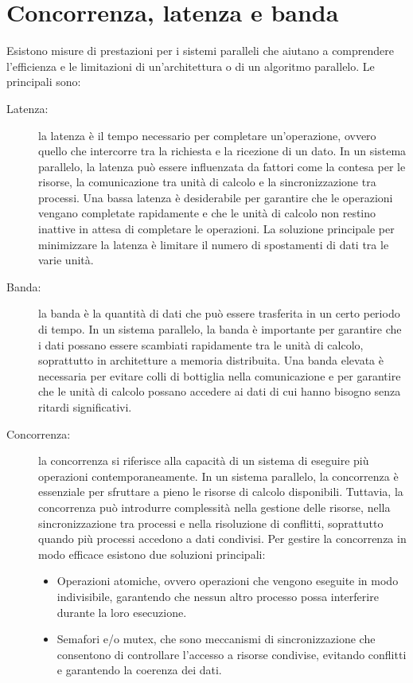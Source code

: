 \section{Concorrenza, latenza e banda}
Esistono misure di prestazioni per i sistemi paralleli che aiutano a comprendere l'efficienza e le limitazioni di un'architettura o di un algoritmo parallelo. Le principali sono:
\begin{description}
    \item[Latenza: ] la latenza è il tempo necessario per completare un'operazione, ovvero quello che intercorre tra la richiesta e la ricezione di un dato. In un sistema parallelo, la latenza può essere influenzata da fattori come la contesa per le risorse, la comunicazione tra unità di calcolo e la sincronizzazione tra processi. Una bassa latenza è desiderabile per garantire che le operazioni vengano completate rapidamente e che le unità di calcolo non restino inattive in attesa di completare le operazioni. La soluzione principale per minimizzare la latenza è limitare il numero di spostamenti di dati tra le varie unità.
    \item[Banda: ] la banda è la quantità di dati che può essere trasferita in un certo periodo di tempo. In un sistema parallelo, la banda è importante per garantire che i dati possano essere scambiati rapidamente tra le unità di calcolo, soprattutto in architetture a memoria distribuita. Una banda elevata è necessaria per evitare colli di bottiglia nella comunicazione e per garantire che le unità di calcolo possano accedere ai dati di cui hanno bisogno senza ritardi significativi.
    \item[Concorrenza: ] la concorrenza si riferisce alla capacità di un sistema di eseguire più operazioni contemporaneamente. In un sistema parallelo, la concorrenza è essenziale per sfruttare a pieno le risorse di calcolo disponibili. Tuttavia, la concorrenza può introdurre complessità nella gestione delle risorse, nella sincronizzazione tra processi e nella risoluzione di conflitti, soprattutto quando più processi accedono a dati condivisi. Per gestire la concorrenza in modo efficace esistono due soluzioni principali:
    \begin{itemize}
        \item Operazioni atomiche, ovvero operazioni che vengono eseguite in modo indivisibile, garantendo che nessun altro processo possa interferire durante la loro esecuzione.
        \item Semafori e/o mutex, che sono meccanismi di sincronizzazione che consentono di controllare l'accesso a risorse condivise, evitando conflitti e garantendo la coerenza dei dati.
    \end{itemize}
\end{description}

